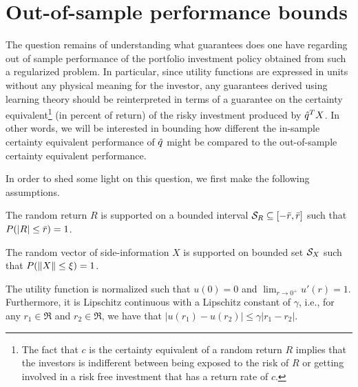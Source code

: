 \section{Out-of-sample performance bounds}\label{sec:oos}

The question remains of understanding what guarantees does one have regarding out of
sample performance of the portfolio investment policy obtained from such a regularized
problem. In particular, since utility functions are expressed in units without any
physical meaning for the investor, any guarantees derived using learning theory should be
reinterpreted in terms of a guarantee on the certainty equivalent\footnote{The fact that
  $c$ is the certainty equivalent of a random return $R$ implies that the investors is
  indifferent between being exposed to the risk of $R$ or getting involved in a risk free
  investment that has a return rate of $c$.} (in percent of return) of the risky
investment produced by ${\hat{q}}^T X$. In other words, we will be interested in bounding how
different the in-sample certainty equivalent performance of ${\hat{q}}$ might be compared to
the out-of-sample certainty equivalent performance. %

In order to shed some light on this question, we first make the following assumptions.

\begin{assumption}\label{ass:R}
  The random return $R$ is supported on a bounded interval
  ${\mathcal{S}_R}\subseteq [-\bar{r},\bar{r}]$ such that $P(|R|\leq \bar{r})=1$.
\end{assumption}

\begin{assumption}\label{ass:X}
  The random vector of side-information $X$ is supported on bounded set ${\mathcal{S}_X}$ such that
  $P(\|X\|\leq \xi)=1$. 
\end{assumption}

\begin{assumption}\label{ass:u}
  The utility function is normalized such that $u(0)=0$ and $\lim_{r\to0^+}u'(r) =
  1$. Furthermore, it is Lipschitz continuous with a Lipschitz constant of $\gamma$, i.e.,
  for any $r_1\in\Re$ and $r_2\in\Re$, we have that
  $|u(r_1) - u(r_2)| \leq \gamma|r_1-r_2|$.
\end{assumption}


